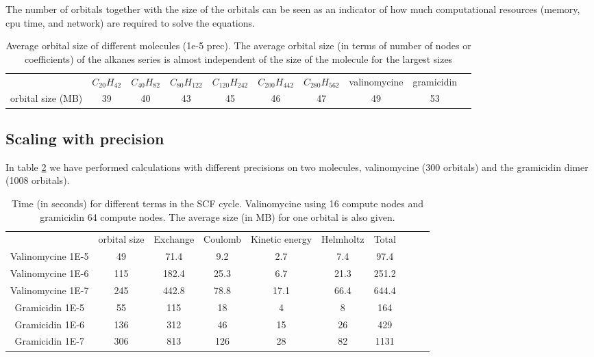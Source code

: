 \documentclass[%
 aip,
 amsmath,amssymb,
 reprint,%
]{revtex4-1}
\begin{document}
The number of orbitals together with the size of the orbitals can be seen as an indicator of how much computational resources (memory, cpu time, and network) are required to solve the equations. 

\begin{table}[t]
    \centering
    \begin{tabular}{cccccccccc}
& $C_{20}H_{42}$& $C_{40}H_{82}$& $C_{80}H_{122}$& $C_{120}H_{242}$&  $C_{200}H_{442}$ & $C_{280}H_{562}$ &valinomycine & gramicidin\\
orbital size (MB)  &  39 &  40   & 43  &  45  & 46 & 47 & 49 & 53\\
    \end{tabular}
    \caption{Average orbital size of different molecules (1e-5 prec). The average orbital size (in terms of number of nodes or coefficients) of the alkanes series is almost independent of the size of the molecule for the largest sizes}
    \label{tab:orbsizes}
\end{table}



\subsection{Scaling with precision}

In table \ref{tab:prec} we have performed calculations with different precisions on two molecules, valinomycine (300 orbitals) and the gramicidin dimer (1008 orbitals).


\begin{table}[t]
    \centering
    \begin{tabular}{cccccccccc}
&orbital size& Exchange &  Coulomb & Kinetic energy& Helmholtz & Total \\
 Valinomycine 1E-5& 49 & 71.4& 9.2& 2.7 & 7.4& 97.4\\
Valinomycine 1E-6& 115 & 182.4& 25.3& 6.7 & 21.3&251.2\\
Valinomycine 1E-7& 245 & 442.8& 78.8&17.1& 66.4&644.4  \\
 Gramicidin 1E-5&55&115&18& 4& 8& 164\\
  Gramicidin 1E-6&136&312 & 46& 15 & 26& 429\\
  Gramicidin 1E-7&306& 813&126& 28& 82& 1131\\ %
    \end{tabular}
    \caption{Time (in seconds) for different terms in the SCF cycle. Valinomycine using 16 compute nodes and gramicidin 64 compute nodes. The average size (in MB) for one orbital is also given.} %
    \label{tab:prec}
 
\end{table}
\end{document}
